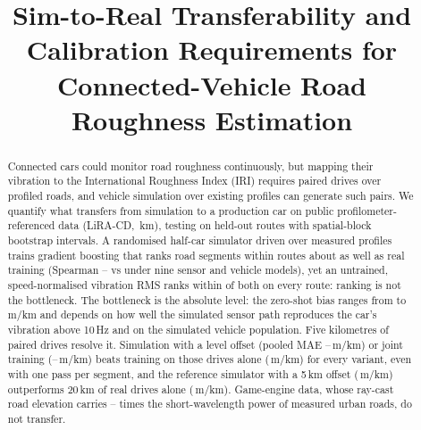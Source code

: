 \documentclass[conference]{IEEEtran}
\begin{document}
\raggedbottom

\title{Sim-to-Real Transferability and Calibration Requirements for Connected-Vehicle Road Roughness Estimation}

\author{
\and
{}
}

\maketitle

\begin{abstract}
Connected cars could monitor road roughness continuously, but mapping their vibration to the International Roughness Index (IRI) requires paired drives over profiled roads, and vehicle simulation over existing profiles can generate such pairs. We quantify what transfers from simulation to a production car on public profilometer-referenced data (LiRA-CD, \liraKm\,km), testing on held-out routes with spatial-block bootstrap intervals. A randomised half-car simulator driven over measured profiles trains gradient boosting that ranks road segments within routes about as well as real training (Spearman \vvRhoMin--\vvRhoMax{} vs \vrGbmRhoWithin{} under nine sensor and vehicle models), yet an untrained, speed-normalised vibration RMS ranks within \rpAbsMax{} of both on every route: ranking is not the bottleneck. The bottleneck is the absolute level: the zero-shot bias ranges from \vvBiasMin{} to \vvBiasMax\,m/km and depends on how well the simulated sensor path reproduces the car's vibration above 10\,Hz and on the simulated vehicle population. Five kilometres of paired drives resolve it. Simulation with a level offset (pooled MAE \pcCalMaeFiveMin--\pcCalMaeFiveMax\,m/km) or joint training (\poMaeFiveMin--\poMaeFiveMax\,m/km) beats training on those drives alone (\vbRealOnlyFive\,m/km) for every variant, even with one pass per segment, and the reference simulator with a 5\,km offset (\vvVzeroCalFive\,m/km) outperforms 20\,km of real drives alone (\vbRealOnlyTwenty\,m/km). Game-engine data, whose ray-cast road elevation carries \gePsdUrbanShortMin--\gePsdUrbanShortMax{} times the short-wavelength power of measured urban roads, do not transfer.
\end{abstract}
\end{document}
